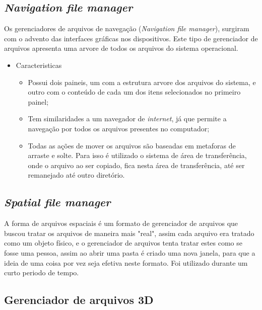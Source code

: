 \documentclass[
	12pt,				%
	openright,			%
	twoside,			%
	a4paper,			%
	chapter=TITLE,		%
	section=TITLE,		%
	english,	
	brazil				%
]{abntex2}
\begin{document}
\subsection{\textit{Navigation file manager}}

Os gerenciadores de arquivos de navegação (\textit{Navigation file manager}), surgiram com o advento das interfaces gráficas nos dispositivos. Este tipo de gerenciador de arquivos apresenta uma arvore de todos os arquivos do sistema operacional.

\begin{itemize}
	\item Caracteristicas
	\begin{itemize}
	\item Possui dois paineis, um com a estrutura arvore dos arquivos do sistema, e outro com o conteúdo de cada um dos itens selecionados no primeiro painel;
	\item Tem similaridades a um navegador de \textit{internet}, já que permite a navegação por todos os arquivos presentes no computador;
	\item Todas as ações de mover os arquivos são baseadas em metaforas de arraste e solte. Para isso é utilizado o sistema de área de transferência, onde o arquivo ao ser copiado, fica nesta área de transferência, até ser remanejado até outro diretório.
	\end{itemize}
\end{itemize}

\subsection{\textit{Spatial file manager}}

A forma de arquivos espaciais é um formato de gerenciador de arquivos que buscou tratar os arquivos de maneira mais "real", assim cada arquivo era tratado como um objeto físico, e o gerenciador de arquivos tenta tratar estes como se fosse uma pessoa, assim ao abrir uma pasta é criado uma nova janela, para que a ideia de uma coisa por vez seja efetiva neste formato. Foi utilizado durante um curto periodo de tempo.

\subsection{Gerenciador de arquivos 3D}
\end{document}
